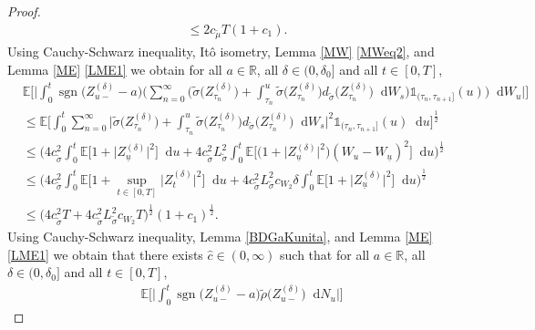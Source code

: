 \documentclass[11pt,a4paper]{article}
\numberwithin{equation}{section}
\theoremstyle{definition}
\newcommand{\E}{{\mathbb{E}}}
\newcommand{\R}{{\mathbb{R}}}
\newcommand{\diff}{\mathop{}\!\mathrm{d}}
\begin{document}
\begin{proof}
\begin{equation}
\begin{aligned}
    \leq 2 c_{\widetilde\mu} T (1+ c_1).
    \end{aligned}
\end{equation}
Using Cauchy-Schwarz inequality, Itô isometry, Lemma \ref{MW} \eqref{MWeq2}, and Lemma \ref{ME} \eqref{LME1} we obtain for all $a\in\R$, all $\delta \in(0,\delta_0]$ and all $t\in[0,T]$,
\begin{equation}\label{pOTE15}
    \begin{aligned}
    &\E\Big[\Big|\int_0^t \operatorname{sgn}\big(Z^{(\delta)}_{u-} -a\big)\Big(\sum_{n=0}^{\infty} \Big( \widetilde\sigma \big(Z^{(\delta)}_{\tau_n}\big) + \int_{\tau_n}^u \widetilde\sigma \big(Z^{(\delta)}_{\tau_n}\big)d_{\widetilde\sigma} \big(Z^{(\delta)}_{\tau_n}\big)\diff W_s \Big)\mathds{1}_{(\tau_n,\tau_{n+1}]}(u)\Big) \diff W_u\Big|\Big]\\
    &\leq \E\Big[\int_0^t \sum_{n=0}^{\infty} \Big|\widetilde\sigma \big(Z^{(\delta)}_{\tau_n}\big) + \int_{\tau_n}^u \widetilde\sigma \big(Z^{(\delta)}_{\tau_n}\big)d_{\widetilde\sigma} \big(Z^{(\delta)}_{\tau_n}\big)\diff W_s \Big|^2 \mathds{1}_{(\tau_n,\tau_{n+1}]}(u)\diff u\Big]^{\frac{1}{2}}\\
    &\leq \Big( 4 c_{\widetilde\sigma}^2 \int_0^t \E\Big[  1 + \big|Z^{(\delta)}_{\underline u}\big|^2 \Big]\diff u
    + 4 c_{\widetilde\sigma}^2 L_{\widetilde\sigma}^2 \int_0^t \E\Big[ 
    \big(1 + \big|Z^{(\delta)}_{\underline u}\big|^2 \big) (W_u -W_{\underline u})^2\Big]\diff u\Big) ^{\frac{1}{2}}\\
    &\leq \Big( 4 c_{\widetilde\sigma}^2 \int_0^t \E\Big[1+ \sup_{t\in[0,T]}\big|Z^{(\delta)}_{t}\big|^2\Big]\diff u
    + 4 c_{\widetilde\sigma}^2 L_{\widetilde\sigma}^2 c_{W_2} \delta \int_0^t \E\Big[  1 + \big|Z^{(\delta)}_{\underline u}\big|^2 \Big]\diff u\Big) ^{\frac{1}{2}}\\
    &\leq \Big( 4 c_{\widetilde\sigma}^2 T + 4 c_{\widetilde\sigma}^2 L_{\widetilde\sigma}^2 c_{W_2} T\Big)^\frac{1}{2} (1+c_1)^\frac{1}{2}.
    \end{aligned}
\end{equation}
Using Cauchy-Schwarz inequality, Lemma \ref{BDGaKunita}, and Lemma \ref{ME} \eqref{LME1} we obtain that there exists $\hat c\in(0,\infty)$ such that for all $a\in\R$, all $\delta \in(0,\delta_0]$ and all $t\in[0,T]$,
\begin{equation}\label{pOTE16}
    \begin{aligned}
    &\E\Big[\Big|\int_0^t \operatorname{sgn}\big(Z^{(\delta)}_{u-} -a\big)\widetilde\rho\big(Z^{(\delta)}_{u-}\big) \diff N_u\Big|\Big]

\end{aligned}
\end{equation}
\end{proof}
\end{document}
